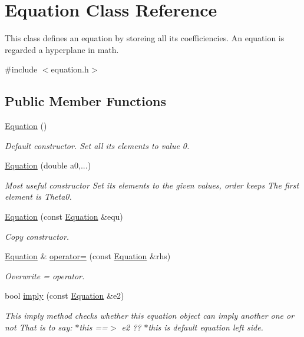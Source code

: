 \hypertarget{classEquation}{}\section{Equation Class Reference}
\label{classEquation}


This class defines an equation by storeing all its coefficiencies. An equation is regarded a hyperplane in math.  




{\ttfamily \#include $<$equation.\+h$>$}

\subsection*{Public Member Functions}
\begin{DoxyCompactItemize}
\item 
\hyperlink{classEquation_a68511fc719250ed80f86c50de9136733}{Equation} ()
\begin{DoxyCompactList}\small\item\em Default constructor. Set all its elements to value 0. \end{DoxyCompactList}\item 
\hyperlink{classEquation_a2899879892ff76b229b4f11c0ec1de78}{Equation} (double a0,...)
\begin{DoxyCompactList}\small\item\em Most useful constructor Set its elements to the given values, order keeps The first element is Theta0. \end{DoxyCompactList}\item 
\hyperlink{classEquation_a81aaa52692da38c62bb684186912d91c}{Equation} (const \hyperlink{classEquation}{Equation} \&equ)
\begin{DoxyCompactList}\small\item\em Copy constructor. \end{DoxyCompactList}\item 
\hyperlink{classEquation}{Equation} \& \hyperlink{classEquation_a114154c932768fbe0e3587c10c44071d}{operator=} (const \hyperlink{classEquation}{Equation} \&rhs)
\begin{DoxyCompactList}\small\item\em Overwrite = operator. \end{DoxyCompactList}\item 
bool \hyperlink{classEquation_a0e6c0d52385361a604b5a8cab3d42e5e}{imply} (const \hyperlink{classEquation}{Equation} \&e2)
\begin{DoxyCompactList}\small\item\em This imply method checks whether this equation object can imply another one or not That is to say\+: $\ast$this ==$>$ e2 ?? $\ast$this is default equation left side. \end{DoxyCompactList}\item 

\end{DoxyCompactItemize}
